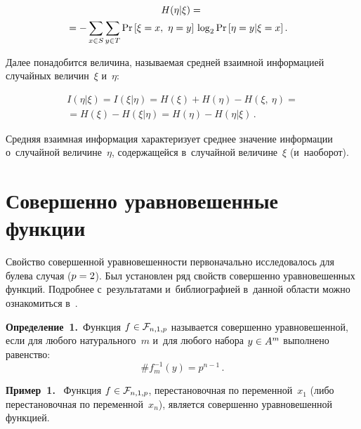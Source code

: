 \begin{multicols}{2}
\begin{itemize}
\noindent
 \begin{multline*}
    H(\eta|\xi) ={}\\
    \hspace*{-16pt}{}= - \sum\limits_{x\in S} \sum\limits_{y\in T} 
    \mathrm{Pr}\,[\xi = x,\ \eta = y]\, \log_2 
\mathrm{Pr}\,[\eta = y|\xi = x]\,.\hspace*{-5pt}
\end{multline*}
\end{itemize}

Далее понадобится величина, называемая средней взаимной информацией случайных 
величин~$\xi$ и~$\eta$:

\noindent
\begin{multline*}
I(\eta|\xi) = I(\xi|\eta) = H(\xi) + H(\eta) - H(\xi,~\eta) ={}\\
{}= H(\xi) - 
H(\xi|\eta) = H(\eta) - H(\eta|\xi)\,.
\end{multline*}

Средняя взаимная информация характеризует среднее значение информации 
о~случайной величине~$\eta$, содержащейся в~случайной величине~$\xi$ (и~на\-обо\-рот).

\vspace*{-4pt}

\section{Совершенно уравновешенные функции}

\vspace*{-2pt}

Свойство совершенной уравновешенности первоначально исследовалось для булева 
случая ($p \hm= 2$). Был установлен ряд свойств совершенно уравновешенных функций. 
Подробнее с~результатами и~библиографией в~данной области можно ознакомиться 
в~\cite{Logachev_Salnikov}.

\smallskip

\noindent
\textbf{Определение~1.}\
    Функция $f\hm\in \mathcal{F}_{n,1,p}$ называется совершенно уравновешенной, 
если для любого натурального~$m$ и~для любого набора $y \hm\in A^m$ выполнено 
равенство:
    $$
    \# f^{-1}_m(y) = p^{n-1}\,.
$$

\noindent
\textbf{Пример~1.}\
        Функция  $f\hm\in \mathcal{F}_{n,1,p}$, перестановочная по переменной~$x_1$ 
        (либо перестановочная по переменной~$x_n$), является совершенно 
уравновешенной функцией.

\smallskip


\end{multicols}
